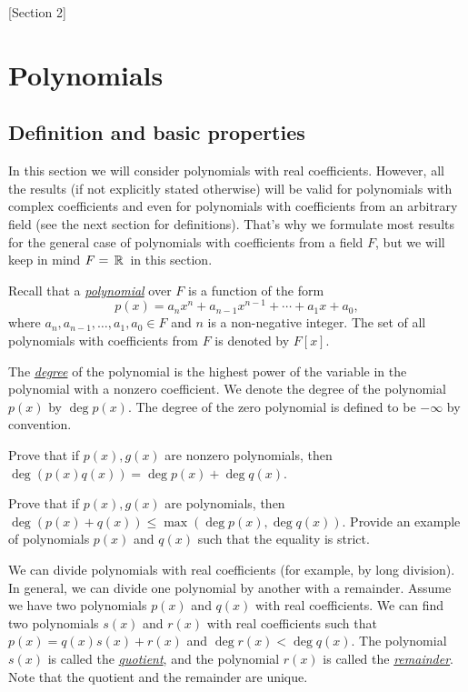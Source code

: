 [Section 2]

\newpage

\section{Polynomials}

\subsection{Definition and basic properties}

In this section we will consider polynomials with real coefficients. However, all the results (if not explicitly stated otherwise) will be valid for polynomials with complex coefficients and even for polynomials with coefficients from an arbitrary field (see the next section for definitions). That's why we formulate most results for the general case of polynomials with coefficients from a field $F$, but we will keep in mind $F = \,\mathbb{R}\,$ in this section.

Recall that a \underline{\it polynomial} over $F$ is a function of the form 
$$p(x) = a_n x^n + a_{n-1} x^{n-1} + \cdots + a_1 x + a_0,$$
where $a_n, a_{n-1}, \ldots, a_1, a_0\in F$ and $n$ is a non-negative integer. The set of all polynomials with coefficients from $F$ is denoted by $F[x]$.

The \underline{\it degree} of the polynomial is the highest power of the variable in the polynomial with a nonzero coefficient. We denote the degree of the polynomial $p(x)$ by $\deg p(x)$. The degree of the zero polynomial is defined to be $-\infty$ by convention.

\begin{exercise}
Prove that if $p(x), g(x)$ are nonzero polynomials, then $\deg(p(x)q(x)) = \deg p(x) + \deg q(x)$.
\end{exercise}

\begin{exercise}
Prove that if $p(x), g(x)$ are polynomials, then $\deg(p(x) + q(x)) \leqslant \max(\deg p(x), \deg q(x))$. Provide an example of polynomials $p(x)$ and $q(x)$ such that the equality is strict.
\end{exercise}

We can divide polynomials with real coefficients (for example, by long division). In general, we can divide one polynomial by another with a remainder. Assume we have two polynomials $p(x)$ and $q(x)$ with real coefficients. We can find two polynomials $s(x)$ and $r(x)$ with real coefficients such that $p(x) = q(x)s(x) + r(x)$ and $\deg r(x) < \deg q(x)$. The polynomial $s(x)$ is called the \underline{\it quotient}, and the polynomial $r(x)$ is called the \underline{\it remainder}. Note that the quotient and the remainder are unique.

